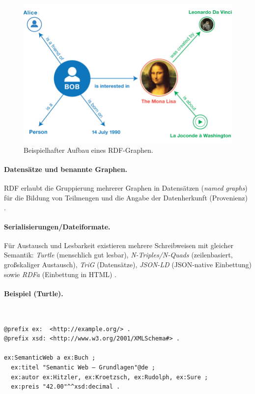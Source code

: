 \begin{figure}[h]
\centering
\includegraphics[width=\linewidth]{Abbildungen/example-graph.jpg}
\caption{Beispielhafter Aufbau eines RDF-Graphen.}
\label{fig:example-rdf-graph}
\end{figure}


\paragraph{Datensätze und benannte Graphen.} RDF erlaubt die Gruppierung mehrerer Graphen in Datensätzen (\emph{named graphs}) für die Bildung von Teilmengen und die Angabe der Datenherkunft (Provenienz) \cite{RDF11Primer}.

\paragraph{Serialisierungen/Dateiformate.} Für Austausch und Lesbarkeit existieren mehrere Schreibweisen mit gleicher Semantik: \emph{Turtle} (menschlich gut lesbar), \emph{N-Triples/N-Quads} (zeilenbasiert, großskaliger Austausch), \emph{TriG} (Datensätze), \emph{JSON-LD} (JSON-native Einbettung) sowie \emph{RDFa} (Einbettung in HTML) \cite{RDF11Primer}.

\paragraph{Beispiel (Turtle).}\mbox{}\\[-1.5ex]
\begin{lstlisting}
@prefix ex:  <http://example.org/> .
@prefix xsd: <http://www.w3.org/2001/XMLSchema#> .

ex:SemanticWeb a ex:Buch ;
  ex:titel "Semantic Web – Grundlagen"@de ;
  ex:autor ex:Hitzler, ex:Kroetzsch, ex:Rudolph, ex:Sure ;
  ex:preis "42.00"^^xsd:decimal .
\end{lstlisting}

